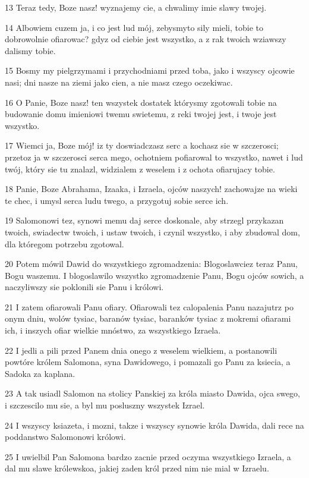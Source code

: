 \par 13 Teraz tedy, Boze nasz! wyznajemy cie, a chwalimy imie slawy twojej.
\par 14 Albowiem cuzem ja, i co jest lud mój, zebysmyto sily mieli, tobie to dobrowolnie ofiarowac? gdyz od ciebie jest wszystko, a z rak twoich wziawszy dalismy tobie.
\par 15 Bosmy my pielgrzymami i przychodniami przed toba, jako i wszyscy ojcowie nasi; dni nasze na ziemi jako cien, a nie masz czego oczekiwac.
\par 16 O Panie, Boze nasz! ten wszystek dostatek którysmy zgotowali tobie na budowanie domu imieniowi twemu swietemu, z reki twojej jest, i twoje jest wszystko.
\par 17 Wiemci ja, Boze mój! iz ty doswiadczasz serc a kochasz sie w szczerosci; przetoz ja w szczerosci serca mego, ochotniem pofiarowal to wszystko, nawet i lud twój, który sie tu znalazl, widzialem z weselem i z ochota ofiarujacy tobie.
\par 18 Panie, Boze Abrahama, Izaaka, i Izraela, ojców naszych! zachowajze na wieki te chec, i umysl serca ludu twego, a przygotuj sobie serce ich.
\par 19 Salomonowi tez, synowi memu daj serce doskonale, aby strzegl przykazan twoich, swiadectw twoich, i ustaw twoich, i czynil wszystko, i aby zbudowal dom, dla któregom potrzebu zgotowal.
\par 20 Potem mówil Dawid do wszystkiego zgromadzenia: Blogoslawciez teraz Panu, Bogu waszemu. I blogoslawilo wszystko zgromadzenie Panu, Bogu ojców sowich, a naczyliwszy sie poklonili sie Panu i królowi.
\par 21 I zatem ofiarowali Panu ofiary. Ofiarowali tez calopalenia Panu nazajutrz po onym dniu, wolów tysiac, baranów tysiac, baranków tysiac z mokremi ofiarami ich, i inszych ofiar wielkie mnóstwo, za wszystkiego Izraela.
\par 22 I jedli a pili przed Panem dnia onego z weselem wielkiem, a postanowili powtóre królem Salomona, syna Dawidowego, i pomazali go Panu za ksiecia, a Sadoka za kaplana.
\par 23 A tak usiadl Salomon na stolicy Panskiej za króla miasto Dawida, ojca swego, i szczescilo mu sie, a byl mu posluszny wszystek Izrael.
\par 24 I wszyscy ksiazeta, i mozni, takze i wszyscy synowie króla Dawida, dali rece na poddanstwo Salomonowi królowi.
\par 25 I uwielbil Pan Salomona bardzo zacnie przed oczyma wszystkiego Izraela, a dal mu slawe królewskoa, jakiej zaden król przed nim nie mial w Izraelu.
